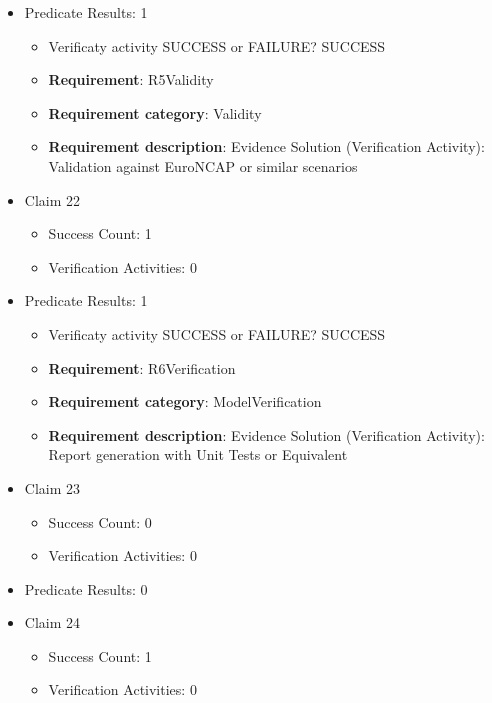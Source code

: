 \documentclass{article}
\begin{document}
\begin{itemize}
									    
				\item Predicate Results: 1
					\begin{itemize}				
					\item Verificaty activity SUCCESS or FAILURE? SUCCESS
					
					\item \textbf{Requirement}: R5Validity 
					\item \textbf{Requirement category}: Validity
					\item \textbf{Requirement description}: Evidence Solution (Verification Activity): Validation against EuroNCAP or similar scenarios
					\end{itemize}

  				  \item Claim 22
				\begin{itemize}
			    	\item Success Count: 1 
			    	\item Verification Activities: 0
				\end{itemize}
				
									    
				\item Predicate Results: 1
					\begin{itemize}				
					\item Verificaty activity SUCCESS or FAILURE? SUCCESS
					
					\item \textbf{Requirement}: R6Verification 
					\item \textbf{Requirement category}: ModelVerification
					\item \textbf{Requirement description}: Evidence Solution (Verification Activity): Report generation with Unit Tests or Equivalent
					\end{itemize}

  				  \item Claim 23
				\begin{itemize}
			    	\item Success Count: 0 
			    	\item Verification Activities: 0
				\end{itemize}
				
									    
				\item Predicate Results: 0

  				  \item Claim 24
				\begin{itemize}
			    	\item Success Count: 1 
			    	\item Verification Activities: 0
				\end{itemize}
				

\end{itemize}
\end{document}

